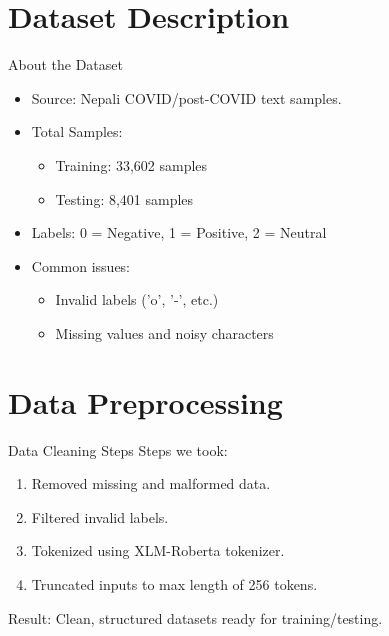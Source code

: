 \documentclass[aspectratio=169]{beamer}
\begin{document}
\section{Dataset Description}
\begin{frame}{About the Dataset}
  \begin{itemize}
    \item Source: Nepali COVID/post-COVID text samples.
    \item Total Samples:
          \begin{itemize}
            \item Training: 33,602 samples
            \item Testing: 8,401 samples
          \end{itemize}
    \item Labels: 0 = Negative, 1 = Positive, 2 = Neutral
    \item Common issues:
          \begin{itemize}
            \item Invalid labels ('o', '-', etc.)
            \item Missing values and noisy characters
          \end{itemize}
  \end{itemize}
\end{frame}

\section{Data Preprocessing}
\begin{frame}{Data Cleaning Steps}
  Steps we took:
  \begin{enumerate}
    \item Removed missing and malformed data.
    \item Filtered invalid labels.
    \item Tokenized using XLM-Roberta tokenizer.
    \item Truncated inputs to max length of 256 tokens.
  \end{enumerate}

  Result: Clean, structured datasets ready for training/testing.
\end{frame}

\end{document}
